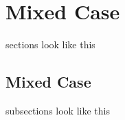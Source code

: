 

\section{Mixed Case} 
sections look like this 

\subsection{Mixed Case}
subsections look like this
